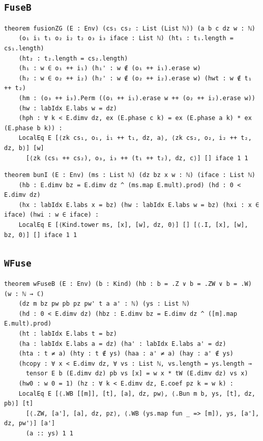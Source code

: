 \subsection{\texttt{FuseB}}
\begin{lstlisting}[style=leancore]
theorem fusionZG (E : Env) (cs₁ cs₂ : List (List ℕ)) (a b c dz w : ℕ)
    (o₁ i₁ t₁ o₂ i₂ t₂ o₃ i₃ iface : List ℕ) (ht₁ : t₁.length = cs₁.length)
    (ht₂ : t₂.length = cs₂.length)
    (h₁ : w ∈ o₁ ++ i₁) (h₁' : w ∉ (o₁ ++ i₁).erase w)
    (h₂ : w ∈ o₂ ++ i₂) (h₂' : w ∉ (o₂ ++ i₂).erase w) (hwt : w ∉ t₁ ++ t₂)
    (hm : (o₃ ++ i₃).Perm ((o₁ ++ i₁).erase w ++ (o₂ ++ i₂).erase w))
    (hw : labIdx E.labs w = dz)
    (hph : ∀ k < E.dimv dz, ex (E.phase c k) = ex (E.phase a k) * ex (E.phase b k)) :
    LocalEq E [⟨zk cs₁, o₁, i₁ ++ t₁, dz, a⟩, ⟨zk cs₂, o₂, i₂ ++ t₂, dz, b⟩] [w]
      [⟨zk (cs₁ ++ cs₂), o₃, i₃ ++ (t₁ ++ t₂), dz, c⟩] [] iface 1 1
\end{lstlisting}
\begin{lstlisting}[style=leancore]
theorem bunI (E : Env) (ms : List ℕ) (dz bz x w : ℕ) (iface : List ℕ)
    (hb : E.dimv bz = E.dimv dz ^ (ms.map E.mult).prod) (hd : 0 < E.dimv dz)
    (hx : labIdx E.labs x = bz) (hw : labIdx E.labs w = bz) (hxi : x ∈ iface) (hwi : w ∈ iface) :
    LocalEq E [⟨Kind.tower ms, [x], [w], dz, 0⟩] [] [⟨.I, [x], [w], bz, 0⟩] [] iface 1 1
\end{lstlisting}

\subsection{\texttt{WFuse}}
\begin{lstlisting}[style=leancore]
theorem wFuseB (E : Env) (b : Kind) (hb : b = .Z ∨ b = .ZW ∨ b = .W) (w : ℕ → ℂ)
    (dz m bz pw pb pz pw' t a a' : ℕ) (ys : List ℕ)
    (hd : 0 < E.dimv dz) (hbz : E.dimv bz = E.dimv dz ^ ([m].map E.mult).prod)
    (ht : labIdx E.labs t = bz)
    (ha : labIdx E.labs a = dz) (ha' : labIdx E.labs a' = dz)
    (hta : t ≠ a) (hty : t ∉ ys) (haa : a' ≠ a) (hay : a' ∉ ys)
    (hcopy : ∀ x < E.dimv dz, ∀ vs : List ℕ, vs.length = ys.length →
      tensor E b (E.dimv dz) pb vs [x] = w x * tW (E.dimv dz) vs x)
    (hw0 : w 0 = 1) (hz : ∀ k < E.dimv dz, E.coef pz k = w k) :
    LocalEq E [⟨.WB [[m]], [t], [a], dz, pw⟩, ⟨.Bun m b, ys, [t], dz, pb⟩] [t]
      [⟨.ZW, [a'], [a], dz, pz⟩, ⟨.WB (ys.map fun _ => [m]), ys, [a'], dz, pw'⟩] [a']
      (a :: ys) 1 1
\end{lstlisting}

